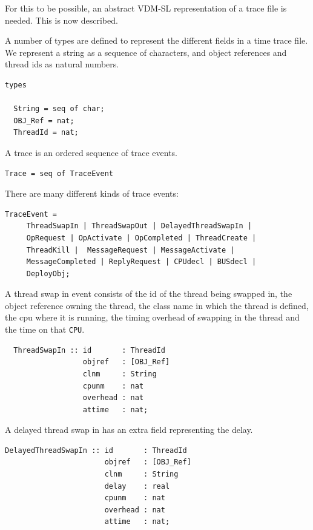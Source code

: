 \documentclass{overturerepchap}
\begin{document}
For this to be possible, an abstract VDM-SL representation of a trace
file is needed.  This is now described.

A number of types are defined to represent the different fields in a
time trace file. We represent a string as a sequence of characters,
and object references and thread ids as natural numbers.

\begin{lstlisting}
types

  String = seq of char;
  OBJ_Ref = nat;
  ThreadId = nat;
\end{lstlisting}

A trace is an ordered sequence of trace events.

\begin{lstlisting}
Trace = seq of TraceEvent
\end{lstlisting}

There are many different kinds of trace events:

\begin{lstlisting}
TraceEvent = 
     ThreadSwapIn | ThreadSwapOut | DelayedThreadSwapIn |
     OpRequest | OpActivate | OpCompleted | ThreadCreate |
     ThreadKill |  MessageRequest | MessageActivate |
     MessageCompleted | ReplyRequest | CPUdecl | BUSdecl |
     DeployObj; 
\end{lstlisting}

A thread swap in event consists of the id of the thread being swapped
in, the object reference owning the thread, the class name in
which the thread is defined, the cpu where it is running, the 
timing overhead of swapping in the thread and the time on that \texttt{CPU}.

\begin{lstlisting}
  ThreadSwapIn :: id       : ThreadId
                  objref   : [OBJ_Ref]
                  clnm     : String
                  cpunm    : nat 
                  overhead : nat
                  attime   : nat;
\end{lstlisting}

A delayed thread swap in has an extra field representing the delay.

\begin{lstlisting}
DelayedThreadSwapIn :: id       : ThreadId
                       objref   : [OBJ_Ref]
                       clnm     : String
                       delay    : real
                       cpunm    : nat
                       overhead : nat
                       attime   : nat;
\end{lstlisting}
\end{document}
